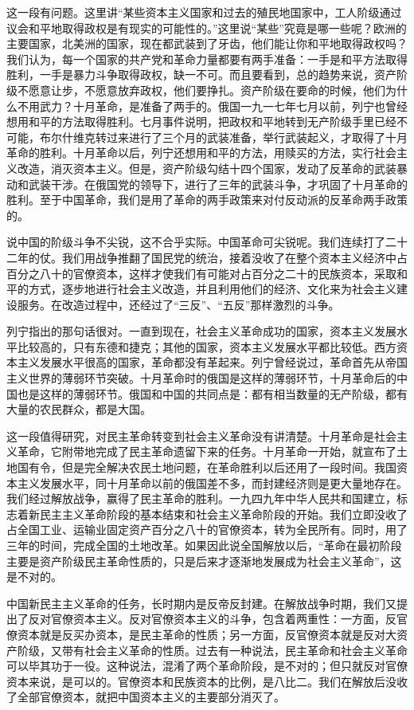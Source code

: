 这一段有问题。这里讲“某些资本主义国家和过去的殖民地国家中，工人阶级通过议会和平地取得政权是有现实的可能性的。”这里说“某些”究竟是哪一些呢？欧洲的主要国家，北美洲的国家，现在都武装到了牙齿，他们能让你和平地取得政权吗？我们认为，每一个国家的共产党和革命力量都要有两手准备：一手是和平方法取得胜利，一手是暴力斗争取得政权，缺一不可。而且要看到，总的趋势来说，资产阶级不愿意让步，不愿意放弃政权，他们要挣扎。资产阶级在要命的时候，他们为什么不用武力？十月革命，是准备了两手的。俄国一九一七年七月以前，列宁也曾经想用和平的方法取得胜利。七月事件说明，把政权和平地转到无产阶级手里已经不可能，布尔什维克转过来进行了三个月的武装准备，举行武装起义，才取得了十月革命的胜利。十月革命以后，列宁还想用和平的方法，用赎买的方法，实行社会主义改造，消灭资本主义。但是，资产阶级勾结十四个国家，发动了反革命的武装暴动和武装干涉。在俄国党的领导下，进行了三年的武装斗争，才巩固了十月革命的胜利。至于中国革命，我们是用了革命的两手政策来对付反动派的反革命两手政策的。

说中国的阶级斗争不尖锐，这不合乎实际。中国革命可尖锐呢。我们连续打了二十二年的仗。我们用战争推翻了国民党的统治，接着没收了在整个资本主义经济中占百分之八十的官僚资本，这样才使我们有可能对占百分之二十的民族资本，采取和平的方式，逐步地进行社会主义改造，并且利用他们的经济、文化来为社会主义建设服务。在改造过程中，还经过了“三反”、“五反”那样激烈的斗争。

列宁指出的那句话很对。一直到现在，社会主义革命成功的国家，资本主义发展水平比较高的，只有东德和捷克；其他的国家，资本主义发展水平都比较低。西方资本主义发展水平很高的国家，革命都没有革起来。列宁曾经说过，革命首先从帝国主义世界的薄弱环节突破。十月革命时的俄国是这样的薄弱环节，十月革命后的中国也是这样的薄弱环节。俄国和中国的共同点是：都有相当数量的无产阶级，都有大量的农民群众，都是大国。

这一段值得研究，对民主革命转变到社会主义革命没有讲清楚。十月革命是社会主义革命，它附带地完成了民主革命遗留下来的任务。十月革命一开始，就宣布了土地国有令，但是完全解决农民土地问题，在革命胜利以后还用了一段时间。我国资本主义发展水平，同十月革命以前的俄国差不多，而封建经济则是更大量地存在。我们经过解放战争，赢得了民主革命的胜利。一九四九年中华人民共和国建立，标志着新民主主义革命阶段的基本结束和社会主义革命阶段的开始。我们立即没收了占全国工业、运输业固定资产百分之八十的官僚资本，转为全民所有。同时，用了三年的时间，完成全国的土地改革。如果因此说全国解放以后，“革命在最初阶段主要是资产阶级民主革命性质的，只是后来才逐渐地发展成为社会主义革命”，这是不对的。

中国新民主主义革命的任务，长时期内是反帝反封建。在解放战争时期，我们又提出了反对官僚资本主义。反对官僚资本主义的斗争，包含着两重性：一方面，反官僚资本就是反买办资本，是民主革命的性质；另一方面，反官僚资本就是反对大资产阶级，又带有社会主义革命的性质。过去有一种说法，民主革命和社会主义革命可以毕其功于一役。这种说法，混淆了两个革命阶段，是不对的；但只就反对官僚资本来说，是可以的。官僚资本和民族资本的比例，是八比二。我们在解放后没收了全部官僚资本，就把中国资本主义的主要部分消灭了。

